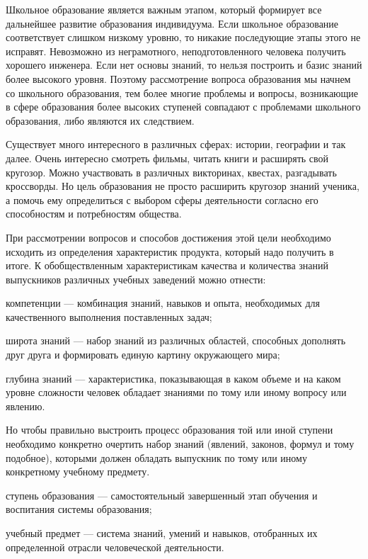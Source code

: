 Школьное образование является важным этапом, который формирует все дальнейшее развитие образования индивидуума. Если школьное образование соответствует слишком низкому уровню, то никакие последующие этапы этого не исправят. Невозможно из неграмотного, неподготовленного человека получить хорошего инженера. Если нет основы знаний, то нельзя построить и базис знаний более высокого уровня. Поэтому рассмотрение вопроса образования мы начнем со школьного образования, тем более многие проблемы и вопросы, возникающие в сфере образования более высоких ступеней совпадают с проблемами школьного образования, либо являются их следствием.

Существует много интересного в различных сферах: истории, географии и так далее.  Очень интересно смотреть фильмы, читать книги и расширять свой кругозор. Можно участвовать в различных викторинах, квестах, разгадывать кроссворды. Но цель образования не просто расширить кругозор знаний ученика, а помочь ему определиться с выбором сферы деятельности согласно его способностям и потребностям общества.

При рассмотрении вопросов и способов достижения этой цели необходимо исходить из определения характеристик продукта, который надо получить в итоге. К обобществленным характеристикам качества и количества знаний выпускников различных учебных заведений можно отнести:
\begin{textitemize}
	\item компетенции --- комбинация знаний, навыков и опыта, необходимых для качественного выполнения поставленных задач;
	\item широта знаний --- набор знаний из различных областей, способных дополнять друг друга и формировать единую картину окружающего мира;
	\item глубина знаний --- характеристика, показывающая в каком объеме и на каком уровне сложности человек обладает знаниями по тому или иному вопросу или явлению.
\end{textitemize}

Но чтобы правильно выстроить процесс образования той или иной ступени необходимо конкретно очертить набор знаний (явлений, законов, формул и тому подобное), которыми должен обладать выпускник по тому или иному конкретному учебному предмету.
\begin{textitemize}
	\item ступень образования --- самостоятельный завершенный этап обучения и воспитания системы образования;
	\item учебный предмет --- система знаний, умений и навыков, отобранных их определенной отрасли человеческой деятельности.
\end{textitemize}

